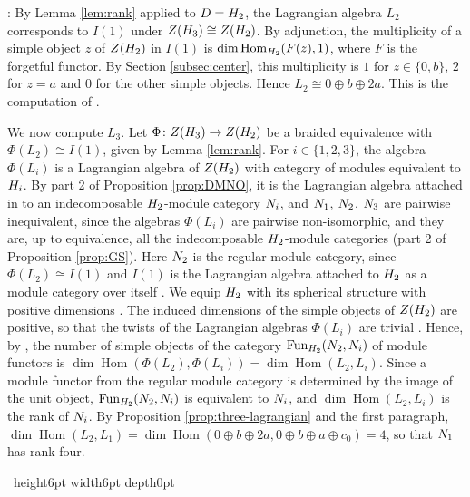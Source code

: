 \documentclass[leqno]{article}
\let\cal\relax
\newcommand{\cal}{\mathcal}
\newcommand{\qed}{\hfill \vrule height6pt  width6pt depth0pt}
\newcommand{\co}{\colon}
\newenvironment{proof}[1][]{\noindent {\it Proof #1} : }{\hbox{~}\qed
\smallskip
}
\numberwithin{equation}{section}
\begin{document}
\begin{proof}
By Lemma \ref{lem:rank} applied to $\cal D = \cal H_2$, the Lagrangian algebra $L_2$ corresponds to $I(1)$ under $Z(\cal H_3) \cong Z(\cal H_2)$. By adjunction, the multiplicity of a simple object $z$ of $Z(\cal H_2)$ in $I(1)$ is $\dim\operatorname{Hom}_{\cal H_2}(F(z),1)$, where $F$ is the forgetful functor. By Section \ref{subsec:center}, this multiplicity is $1$ for $z \in \{0,b\}$, $2$ for $z = a$ and $0$ for the other simple objects. Hence $L_2 \cong 0 \oplus b \oplus 2a$. This is the computation of \cite[p.~18]{EvG11}.

We now compute $L_3$. Let $\Phi \co Z(\cal H_3) \to Z(\cal H_2)$ be a braided equivalence with $\Phi(L_2) \cong I(1)$, given by Lemma \ref{lem:rank}. For $i \in \{1,2,3\}$, the algebra $\Phi(L_i)$ is a Lagrangian algebra of $Z(\cal H_2)$ with category of modules equivalent to $\cal H_i$. By part 2 of Proposition \ref{prop:DMNO}, it is the Lagrangian algebra attached in \cite[Section 4.2 p.~17]{DMNO13} to an indecomposable $\cal H_2$-module category $\cal N_i$, and $\cal N_1$, $\cal N_2$, $\cal N_3$ are pairwise inequivalent, since the algebras $\Phi(L_i)$ are pairwise non-isomorphic, and they are, up to equivalence, all the indecomposable $\cal H_2$-module categories (part 2 of Proposition \ref{prop:GS}). Here $\cal N_2$ is the regular module category, since $\Phi(L_2) \cong I(1)$ and $I(1)$ is the Lagrangian algebra attached to $\cal H_2$ as a module category over itself \cite[Remark 4.9 p.~17]{DMNO13}. We equip $\cal H_2$ with its spherical structure with positive dimensions \cite[Proposition 8.23 p.~34]{ENO05}. The induced dimensions of the simple objects of $Z(\cal H_2)$ are positive, so that the twists of the Lagrangian algebras $\Phi(L_i)$ are trivial \cite[Remark 2.19 p.~8]{Ost15}. Hence, by \cite[Remark 2.19 pp.~7--8]{Ost15}, the number of simple objects of the category $\operatorname{Fun}_{\cal H_2}(\cal N_2,\cal N_i)$ of module functors is $\dim\operatorname{Hom}(\Phi(L_2),\Phi(L_i)) = \dim\operatorname{Hom}(L_2,L_i)$. Since a module functor from the regular module category is determined by the image of the unit object, $\operatorname{Fun}_{\cal H_2}(\cal N_2,\cal N_i)$ is equivalent to $\cal N_i$, and $\dim\operatorname{Hom}(L_2,L_i)$ is the rank of $\cal N_i$. By Proposition \ref{prop:three-lagrangian} and the first paragraph, $\dim\operatorname{Hom}(L_2,L_1) = \dim\operatorname{Hom}(0 \oplus b \oplus 2a,0 \oplus b \oplus a \oplus c_0) = 4$, so that $\cal N_1$ has rank four.


\end{proof}
\end{document}
